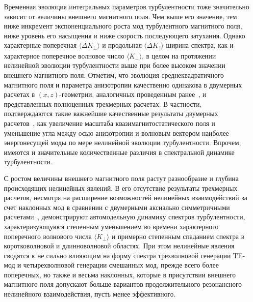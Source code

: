 Временная эволюция интегральных параметров турбулентности тоже значительно зависит от величины внешнего магнитного поля. Чем выше его значение, тем ниже инкремент экспоненциального роста мод турбулентного магнитного поля, ниже уровень его насыщения и ниже скорость последующего затухания. Однако характерные поперечная $\langle \Delta K_\perp\rangle$ и продольная $\langle \Delta K_\|\rangle$ ширина спектра, как и характерное поперечное волновое число $\langle K_\perp\rangle$, в целом на протяжении нелинейной эволюции турбулентности выше при более высоком значении внешнего магнитного поля. Отметим, что эволюция среднеквадратичного магнитного поля и параметра анизотропии качественно одинакова в двумерных расчетах в $(x,z)$-геометрии, аналогичных проведенным ранее~\cite{Camporeale2008,Hellinger2014}, и представленных полноценных трехмерных расчетах. В частности, подтверждаются такие важнейшие качественные результаты двумерных расчетов~\cite{Camporeale2008,Hellinger2014}, как увеличение масштаба квазимагнитостатического поля и уменьшение угла между осью анизотропии и волновым вектором наиболее энергонесущей моды по мере нелинейной эволюции турбулентности. Впрочем, имеются и значительные количественные различия в спектральной динамике турбулентности.

С ростом величины внешнего магнитного поля растут разнообразие и глубина происходящих нелинейных явлений. 
В его отсутствие результаты трехмерных расчетов, несмотря на расширение возможностей нелинейных взаимодействий за счет наклонных мод в сравнении с двумерными аксиально симметричными расчетами~\cite{Kuznetsov2023}, демонстрируют автомодельную динамику спектров турбулентности, характеризующуюся степенным уменьшением во времени характерного поперечного волнового числа $\langle K_\perp \rangle$ и примерно степенным спаданием спектра в коротковолновой и длинноволновой областях. При этом нелинейные явления сводятся к не сильно влияющим на форму спектра трехволновой генерации TE-мод и четырехволновой генерации смешанных мод, прежде всего более поперечных, но также и весьма наклонных, которые в присутствии внешнего магнитного поля допускают больше вариантов продолжительного резонансного нелинейного взаимодействия, пусть менее эффективного.

